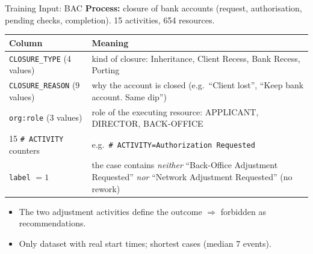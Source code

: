 \documentclass[aspectratio=169]{beamer} %
\begin{document}
\begin{frame}{Training Input: BAC}
  \footnotesize
  \textbf{Process:} closure of bank accounts (request, authorisation, pending
  checks, completion). 15 activities, 654 resources.
  \begin{center}
  \begin{tabular}{lp{9.2cm}}
    \toprule
    \textbf{Column} & \textbf{Meaning} \\
    \midrule
    \texttt{CLOSURE\_TYPE} (4 values) & kind of closure: Inheritance, Client Recess, Bank Recess, Porting \\
    \texttt{CLOSURE\_REASON} (9 values) & why the account is closed (e.g.\ ``Client lost'', ``Keep bank account. Same dip'') \\
    \texttt{org:role} (3 values) & role of the executing resource: APPLICANT, DIRECTOR, BACK-OFFICE \\
    15 \texttt{\# ACTIVITY} counters & e.g.\ \texttt{\# ACTIVITY=Authorization Requested} \\
    \midrule
    \texttt{label} $=1$ & the case contains \emph{neither} ``Back-Office Adjustment Requested''
      \emph{nor} ``Network Adjustment Requested'' (no rework) \\
    \bottomrule
  \end{tabular}
  \end{center}
  \begin{itemize}
    \item The two adjustment activities define the outcome $\Rightarrow$
      \alert{forbidden} as recommendations.
    \item Only dataset with real start times; shortest cases (median 7 events).
  \end{itemize}
\end{frame}
\end{document}

